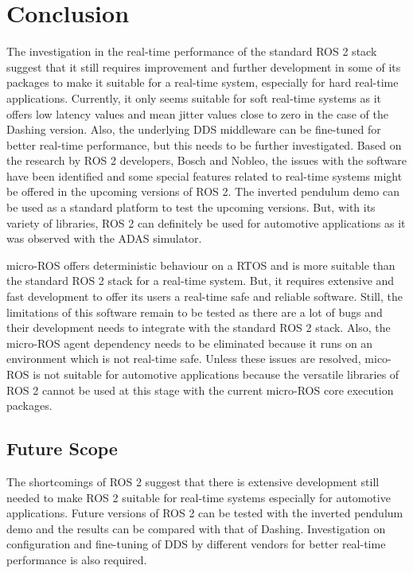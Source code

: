 \documentclass[%
xelatex,
	oneside,		%
	12pt,			%
	parskip=half,	%
	abstracton,
	chapterprefix=true%
    appendixprefix=true]
{scrbook}
\begin{document}
		\chapter{Conclusion}
			
\rofoot[\pagemark]{\pagemark}
The investigation in the real-time performance of the standard ROS 2 stack suggest that it still requires improvement and further development in some of its packages to make it suitable for a real-time system, especially for hard real-time applications. Currently, it only seems suitable for soft real-time systems as it offers low latency values and mean jitter values close to zero in the case of the Dashing version. Also, the underlying DDS middleware can be fine-tuned for better real-time performance, but this needs to be further investigated. Based on the research by ROS 2 developers, Bosch and Nobleo, the issues with the software have been identified and some special features related to real-time systems might be offered in the upcoming versions of ROS 2. The inverted pendulum demo can be used as a standard platform to test the upcoming versions. But, with its variety of libraries, ROS 2 can definitely be used for automotive applications as it was observed with the ADAS simulator.

\vspace*{0.25cm}
micro-ROS offers deterministic behaviour on a RTOS and is more suitable than the standard ROS 2 stack for a real-time system. But, it requires extensive and fast development to offer its users a real-time safe and reliable software. Still, the limitations of this software remain to be tested as there are a lot of bugs and their development needs to integrate with the standard ROS 2 stack. Also, the micro-ROS agent dependency needs to be eliminated because it runs on an environment which is not real-time safe. Unless these issues are resolved, mico-ROS is not suitable for automotive applications because the versatile libraries of ROS 2 cannot be used at this stage with the current micro-ROS core execution packages.


\section{Future Scope}
\vspace*{0.2cm}
The shortcomings of ROS 2 suggest that there is extensive development still needed to make ROS 2 suitable for real-time systems especially for automotive applications.
 Future versions of ROS 2 can be tested with the inverted pendulum demo and the results can be compared with that of Dashing. Investigation on configuration and fine-tuning of DDS by different vendors for better real-time performance is also required.
 \vspace*{0.15cm}
 
\end{document}
